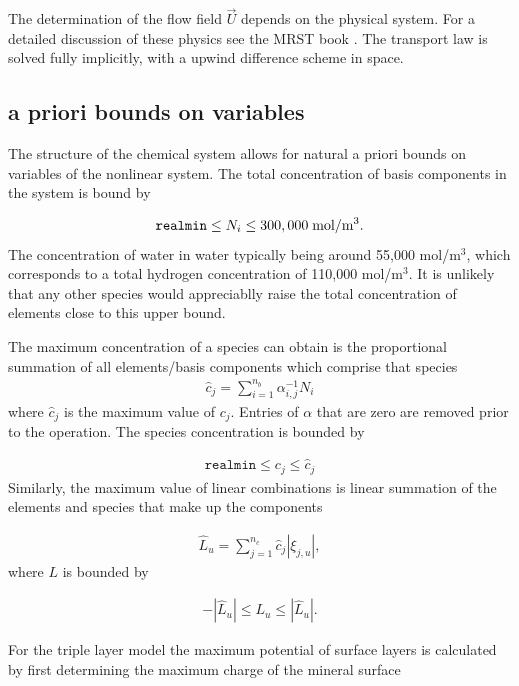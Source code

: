 \documentclass{article}
\begin{document}
The determination of the flow field $\vec{U}$ depends on the physical system. For a detailed discussion of these physics see the MRST book \cite{lie2014}. 
The transport law is solved fully implicitly, with a upwind difference scheme in space. 


\subsection{a priori bounds on variables}

The structure of the chemical system allows for natural a priori bounds on variables of the nonlinear system. 
The total concentration of basis components in the system is bound by 

\begin{align}
    \texttt{realmin} \leq N_i \leq 300,000 \text{\;mol/m$^3$}.
\end{align}
The concentration of water in water typically being around 55,000 mol/m$^3$, which corresponds to a total hydrogen concentration of 110,000 mol/m$^3$. It is unlikely that any other species would appreciablly raise the total concentration of elements close to this upper bound.

The maximum concentration of a species can obtain is the proportional summation of all elements/basis components which comprise that species
\begin{align}
   \hat{c}_j = \sum_{i=1}^{n_b} \alpha_{i,j}^{-1}N_i 
\end{align}
where $\hat{c}_j$ is the maximum value of $c_j$. Entries of $\alpha$ that are zero are removed prior to the operation. The species concentration is bounded by

\begin{align}
    \texttt{realmin} \leq c_j \leq  \hat{c}_j
\end{align}
 Similarly, the maximum value of linear combinations is linear summation of the elements and species that make up the components

\begin{align}
    \hat{L}_u =\sum_{j=1}^{n_c} \hat{c}_j|\xi_{j,u}|, %
\end{align}
where $L$ is bounded by

\begin{align}
    -|\hat{L}_{u}| \leq L_{u} \leq |\hat{L}_{u}|.
\end{align}

For the triple layer model the maximum potential of surface layers is calculated by first determining the maximum charge of the mineral surface
\end{document}
